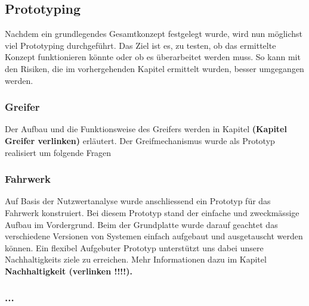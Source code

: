 \subsection{Prototyping}

Nachdem ein grundlegendes Gesamtkonzept festgelegt wurde, wird nun möglichst viel Prototyping durchgeführt. Das Ziel ist es, zu testen, ob das ermittelte Konzept funktionieren könnte oder ob es überarbeitet werden muss. So kann mit den Risiken, die im vorhergehenden Kapitel ermittelt wurden, besser umgegangen werden.

\subsubsection{Greifer}

Der Aufbau und die Funktionsweise des Greifers werden in Kapitel \textbf{(Kapitel Greifer verlinken)} erläutert. Der Greifmechanismus wurde als Prototyp realisiert um folgende Fragen 



\subsubsection{Fahrwerk}

Auf Basis der Nutzwertanalyse wurde anschliessend ein Prototyp für das Fahrwerk konstruiert. Bei diesem Prototyp stand der einfache und zweckmässige Aufbau im Vordergrund. Beim der Grundplatte wurde darauf geachtet das verschiedene  Versionen von Systemen einfach aufgebaut und ausgetauscht werden können. Ein flexibel Aufgebuter Prototyp unterstützt uns dabei unsere Nachhaltigkeits ziele zu erreichen. Mehr Informationen dazu im Kapitel \textbf{Nachhaltigkeit (verlinken !!!!).} 

\subsubsection{...}

